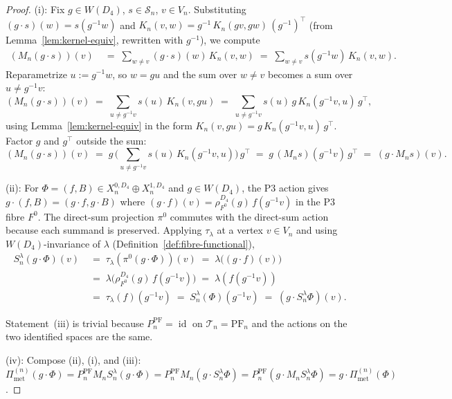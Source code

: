 \documentclass[11pt, a4paper]{amsart}
\theoremstyle{definition}
\newcommand{\id}{\operatorname{id}}
\newcommand{\Met}{\mathrm{met}}
\newcommand{\PF}{\mathrm{PF}}
\newcommand{\Pimet}{\Pi_{\Met}}
\begin{document}
\begin{proof}
(i): Fix $g \in W(D_4)$, $s \in \mathcal S_n$, $v \in V_n$.
Substituting $(g \cdot s)(w) = s(g^{-1}w)$ and
$K_n(v, w) = g^{-1}\,K_n(gv, gw)\,(g^{-1})^\top$
(from Lemma~\ref{lem:kernel-equiv}, rewritten with $g^{-1}$), we
compute
\begin{align*}
  (M_n(g \cdot s))(v)
    &\;=\; \sum_{w \neq v} (g \cdot s)(w)\,K_n(v, w)
    \;=\; \sum_{w \neq v} s(g^{-1}w)\,K_n(v, w).
\end{align*}
Reparametrize $u := g^{-1}w$, so $w = gu$ and the sum over
$w \neq v$ becomes a sum over $u \neq g^{-1}v$:
\[
  (M_n(g \cdot s))(v)
    \;=\; \sum_{u \neq g^{-1}v} s(u)\,K_n(v, gu)
    \;=\; \sum_{u \neq g^{-1}v} s(u)\,g\,K_n(g^{-1}v, u)\,g^\top,
\]
using Lemma~\ref{lem:kernel-equiv} in the form $K_n(v, gu) =
g\,K_n(g^{-1}v, u)\,g^\top$. Factor $g$ and $g^\top$ outside the
sum:
\[
  (M_n(g \cdot s))(v)
    \;=\; g\,\biggl(\sum_{u \neq g^{-1}v}
       s(u)\,K_n(g^{-1}v, u)\biggr)\,g^\top
    \;=\; g\,(M_n s)(g^{-1}v)\,g^\top
    \;=\; (g \cdot M_n s)(v).
\]

(ii): For $\Phi = (f, B) \in X_n^{0, D_4} \oplus X_n^{1, D_4}$
and $g \in W(D_4)$, the P3 action
\cite[Def.~8.1]{RefinementSpaces} gives
$g \cdot (f, B) = (g \cdot f, g \cdot B)$ where
$(g \cdot f)(v) = \rho_{F^0}^{D_4}(g)\,f(g^{-1}v)$ in the P3
fibre $F^0$. The direct-sum projection $\pi^0$ commutes with the
direct-sum action because each summand is preserved. Applying
$\tau_\lambda$ at a vertex $v \in V_n$ and using
$W(D_4)$-invariance of $\lambda$
(Definition~\ref{def:fibre-functional}),
\begin{align*}
  S_n^\lambda(g \cdot \Phi)(v)
    &\;=\; \tau_\lambda(\pi^0(g \cdot \Phi))(v)
     \;=\; \lambda\bigl((g \cdot f)(v)\bigr) \\
    &\;=\; \lambda\bigl(\rho_{F^0}^{D_4}(g)\,f(g^{-1}v)\bigr)
     \;=\; \lambda(f(g^{-1}v)) \\
    &\;=\; \tau_\lambda(f)(g^{-1}v)
     \;=\; S_n^\lambda(\Phi)(g^{-1}v)
     \;=\; (g \cdot S_n^\lambda \Phi)(v).
\end{align*}

Statement~(iii) is trivial because $P_n^\PF = \id$ on
$\mathcal T_n = \PF_n$ and the actions on the two identified
spaces are the same.

(iv): Compose (ii), (i), and (iii): $\Pimet^{(n)}(g \cdot \Phi)
= P_n^\PF M_n S_n^\lambda(g \cdot \Phi) = P_n^\PF M_n(g \cdot S_n^\lambda \Phi)
= P_n^\PF(g \cdot M_n S_n^\lambda \Phi) = g \cdot \Pimet^{(n)}(\Phi)$.
\end{proof}
\end{document}
